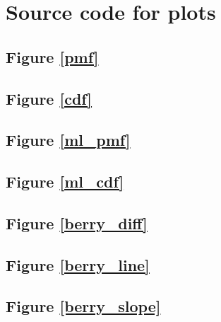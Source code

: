 \chapter{Source code for plots}

\newcommand*{\src}[1]{\section{Figure \ref{#1}}

}

\src{pmf}
\src{cdf}
\src{ml_pmf}
\src{ml_cdf}
\src{berry_diff}
\src{berry_line}
\src{berry_slope}
